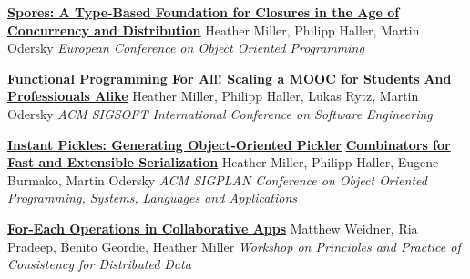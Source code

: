\documentclass[9pt]{article}
\begin{document}
\noindent\href{http://infoscience.epfl.ch/record/191239}{\bf Spores: A Type-Based Foundation for Closures in the Age of}\vspace{-0.03in}
\newline\noindent\href{http://infoscience.epfl.ch/record/191239}{\bf Concurrency and Distribution}
\newline\noindent Heather Miller, Philipp Haller, Martin Odersky
\newline\noindent\emph{European Conference on Object Oriented Programming}
\bigskip

\noindent\href{http://infoscience.epfl.ch/record/190022}{\bf Functional Programming For All! Scaling a MOOC for Students}\vspace{-0.03in}
\newline\noindent\href{http://infoscience.epfl.ch/record/190022}{\bf And Professionals Alike}
\newline\noindent Heather Miller, Philipp Haller, Lukas Rytz, Martin Odersky
\newline\noindent\emph{ACM SIGSOFT International Conference on Software Engineering}
\bigskip

\noindent\href{http://infoscience.epfl.ch/record/188383}{\bf Instant Pickles: Generating Object-Oriented Pickler}\vspace{-0.03in}
\newline\noindent\href{http://infoscience.epfl.ch/record/188383}{\bf Combinators for Fast and Extensible Serialization}
\newline\noindent Heather Miller, Philipp Haller, Eugene Burmako, Martin Odersky
\newline\noindent\emph{ACM SIGPLAN Conference on Object Oriented Programming, Systems,}
\newline\noindent\emph{Languages and Applications}
\bigskip



\noindent\href{https://dl.acm.org/doi/10.1145/3578358.3591323}{\bf For-Each Operations in Collaborative Apps}
\newline\noindent Matthew Weidner, Ria Pradeep, Benito Geordie, Heather Miller
\newline\noindent\emph{Workshop on Principles and Practice of Consistency for Distributed Data}
\bigskip
\end{document}
